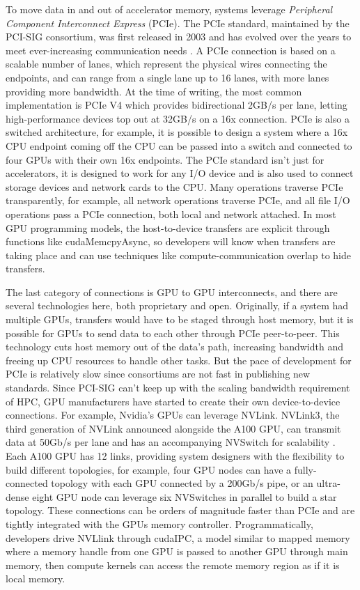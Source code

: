 To move data in and out of accelerator memory, systems leverage \textit{Peripheral Component Interconnect Express} (PCIe).
The PCIe standard, maintained by the PCI-SIG consortium, was first released in 2003 and has evolved over the years to meet ever-increasing communication needs \cite{PCIeIntroPaper, PCIeV5Spec}.
A PCIe connection is based on a scalable number of lanes, which represent the physical wires connecting the endpoints, and can range from a single lane up to 16 lanes, with more lanes providing more bandwidth.
At the time of writing, the most common implementation is PCIe V4 which provides bidirectional 2GB/s per lane, letting high-performance devices top out at 32GB/s on a 16x connection. 
PCIe is also a switched architecture, for example, it is possible to design a system where a 16x CPU endpoint coming off the CPU can be passed into a switch and connected to four GPUs with their own 16x endpoints.
The PCIe standard isn't just for accelerators, it is designed to work for any I/O device and is also used to connect storage devices and network cards to the CPU.
Many operations traverse PCIe transparently, for example, all network operations traverse PCIe, and all file I/O operations pass a PCIe connection, both local and network attached.
In most GPU programming models, the host-to-device transfers are explicit through functions like cudaMemcpyAsync, so developers will know when transfers are taking place and can use techniques like compute-communication overlap to hide transfers.

The last category of connections is GPU to GPU interconnects, and there are several technologies here, both proprietary and open.
Originally, if a system had multiple GPUs, transfers would have to be staged through host memory, but it is possible for GPUs to send data to each other through PCIe peer-to-peer.
This technology cuts host memory out of the data's path, increasing bandwidth and freeing up CPU resources to handle other tasks.
But the pace of development for PCIe is relatively slow since consortiums are not fast in publishing new standards. 
Since PCI-SIG can't keep up with the scaling bandwidth requirement of HPC, GPU manufacturers have started to create their own device-to-device connections.
For example, Nvidia's GPUs can leverage NVLink.
NVLink3, the third generation of NVLink announced alongside the A100 GPU, can transmit data at 50Gb/s per lane and has an accompanying NVSwitch for scalability \cite{A100Whitepaper}.
Each A100 GPU has 12 links, providing system designers with the flexibility to build different topologies, for example, four GPU nodes can have a fully-connected topology with each GPU connected by a 200Gb/s pipe, or an ultra-dense eight GPU node can leverage six NVSwitches in parallel to build a star topology.
These connections can be orders of magnitude faster than PCIe and are tightly integrated with the GPUs memory controller.
Programmatically, developers drive NVLlink through cudaIPC, a model similar to mapped memory where a memory handle from one GPU is passed to another GPU through main memory, then compute kernels can access the remote memory region as if it is local memory.

